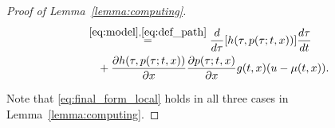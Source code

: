 \documentclass[10pt,conference]{ieeeconf}
\renewcommand{\(}{\left(}
\renewcommand{\)}{\right)}
\renewcommand{\[}{\left[}
\renewcommand{\]}{\right]}
\newcommand{\regularversion}[1]{\iffalse{}#1\fi}
\begin{document}
\begin{proof}[Proof of Lemma~\ref{lemma:computing}]
{\begin{align}
 	&\hspace{-2pt}\overset{\eqref{eq:model},\eqref{eq:def_path}}{=} \frac{d}{d\tau}[h(\tau,p(\tau;t,x))] \frac{d \tau}{dt}\nonumber \\ &\;\;\; + \frac{\partial h(\tau,p(\tau;t,x))}{\partial x}\frac{\partial p(\tau;t,x)}{\partial x} g(t,x) (u - \mu(t,x)). \hspace{-3pt} \label{eq:final_form_local}
\end{align}}%
\regularversion{\begin{align}
    & \hspace{-8pt}\frac{d h(\tau, p(\tau; t,x))}{dt} =  \frac{d}{d\tau}[h(\tau,p(\tau;t,x))] \frac{d \tau}{dt}\nonumber \\ &\;\;\; + \frac{\partial h(\tau,p(\tau;t,x))}{\partial x}\frac{\partial p(\tau;t,x)}{\partial x} g(t,x) (u - \mu(t,x)). \hspace{-3pt} \label{eq:final_form_local}
\end{align}
{For the full steps of the simplifications in this proof, see \cite[Sec.~VI]{extended_version}.}}
Note that \eqref{eq:final_form_local} holds in all three cases in Lemma~\ref{lemma:computing}.


\end{proof}
\end{document}
